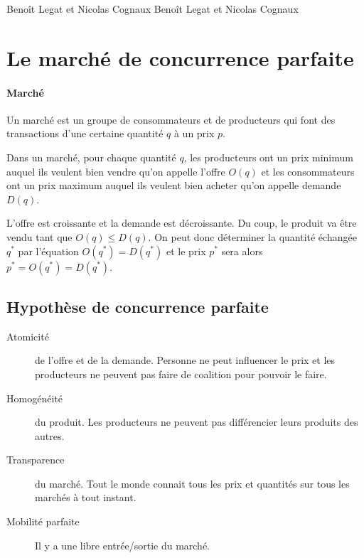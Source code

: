 

{Benoît Legat et Nicolas Cognaux}
{Benoît Legat et Nicolas Cognaux}

\newcommand{\elasticity}{\varepsilon}
\newcommand{\pcompt}{\pi}
\newcommand{\ppur}{\pi_{\mathrm{pur}}}
\newcommand{\surplus}{s}
\newcommand{\surpluscons}{{S_c}}
\newcommand{\surplusprod}{S_p}
\newcommand{\surpluscoll}{S}

\newcommand{\Lagr}{\mathcal{L}}

\section{Le marché de concurrence parfaite}
\paragraph{Marché}
Un marché est un groupe de consommateurs et de producteurs
qui font des transactions d'une certaine quantité $q$ à un prix $p$.

Dans un marché, pour chaque quantité $q$, les producteurs ont un prix
minimum auquel ils veulent bien vendre qu'on appelle l'offre $O(q)$
et les consommateurs ont un prix
maximum auquel ils veulent bien acheter qu'on appelle demande $D(q)$.

L'offre est croissante et la demande est décroissante.
Du coup, le produit va être vendu tant que $O(q) \leq D(q)$.
On peut donc déterminer la quantité échangée $q^*$ par l'équation
$O(q^*) = D(q^*)$ et le prix $p^*$ sera alors $p^* = O(q^*) = D(q^*)$.

\subsection{Hypothèse de concurrence parfaite}
\begin{description}
  \item[Atomicité] de l'offre et de la demande.
    Personne ne peut influencer le prix et
    les producteurs ne peuvent pas faire de coalition pour pouvoir le faire.
  \item[Homogénéité] du produit.
    Les producteurs ne peuvent pas différencier leurs produits des autres.
  \item[Transparence] du marché.
    Tout le monde connait tous les prix et quantités sur tous les marchés
    à tout instant.
  \item[Mobilité parfaite]
    Il y a une libre entrée/sortie du marché.
\end{description}

